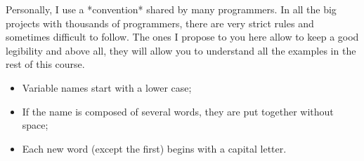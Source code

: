 \documentclass[11pt, a4paper]{article}
\begin{document}
Personally, I use a *convention* shared by many programmers. In all the big projects
with thousands of programmers, there are very strict rules and sometimes difficult
to follow. The ones I propose to you here allow to keep a good legibility and above
all, they will allow you to understand all the examples in the rest of this course.
\begin{itemize}
\item Variable names start with a lower case;
\item If the name is composed of several words, they are put together without space;
\item Each new word (except the first) begins with a capital letter.
\end{itemize}
\end{document}
